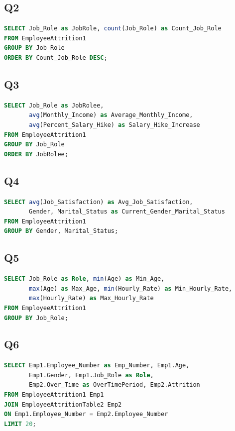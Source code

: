 \documentclass{article}
\begin{document}
\subsection*{Q2}
\begin{lstlisting}[language=SQL]
SELECT Job_Role as JobRole, count(Job_Role) as Count_Job_Role 
FROM EmployeeAttrition1 
GROUP BY Job_Role 
ORDER BY Count_Job_Role DESC;
\end{lstlisting}

\subsection*{Q3}
\begin{lstlisting}[language=SQL]
SELECT Job_Role as JobRolee, 
       avg(Monthly_Income) as Average_Monthly_Income, 
       avg(Percent_Salary_Hike) as Salary_Hike_Increase 
FROM EmployeeAttrition1 
GROUP BY Job_Role 
ORDER BY JobRolee;
\end{lstlisting}

\subsection*{Q4}
\begin{lstlisting}[language=SQL]
SELECT avg(Job_Satisfaction) as Avg_Job_Satisfaction, 
       Gender, Marital_Status as Current_Gender_Marital_Status 
FROM EmployeeAttrition1 
GROUP BY Gender, Marital_Status;
\end{lstlisting}

\subsection*{Q5}
\begin{lstlisting}[language=SQL]
SELECT Job_Role as Role, min(Age) as Min_Age, 
       max(Age) as Max_Age, min(Hourly_Rate) as Min_Hourly_Rate, 
       max(Hourly_Rate) as Max_Hourly_Rate 
FROM EmployeeAttrition1 
GROUP BY Job_Role;
\end{lstlisting}

\subsection*{Q6}
\begin{lstlisting}[language=SQL]
SELECT Emp1.Employee_Number as Emp_Number, Emp1.Age, 
       Emp1.Gender, Emp1.Job_Role as Role, 
       Emp2.Over_Time as OverTimePeriod, Emp2.Attrition 
FROM EmployeeAttrition1 Emp1 
JOIN EmployeeAttritionTable2 Emp2 
ON Emp1.Employee_Number = Emp2.Employee_Number 
LIMIT 20;
\end{lstlisting}
\end{document}
